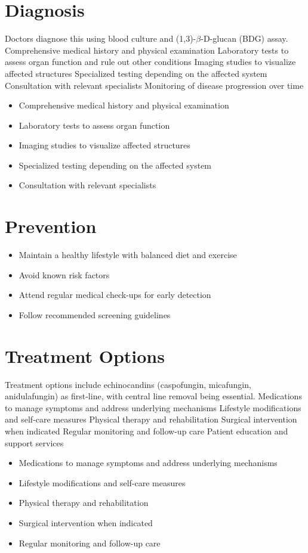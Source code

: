 \section{Diagnosis}
Doctors diagnose this using blood culture and (1,3)-$\beta$-D-glucan (BDG) assay. Comprehensive medical history and physical examination Laboratory tests to assess organ function and rule out other conditions Imaging studies to visualize affected structures Specialized testing depending on the affected system Consultation with relevant specialists Monitoring of disease progression over time

\begin{itemize}[noitemsep]
  \item Comprehensive medical history and physical examination
  \item Laboratory tests to assess organ function
  \item Imaging studies to visualize affected structures
  \item Specialized testing depending on the affected system
  \item Consultation with relevant specialists
\end{itemize}
\section{Prevention}
\begin{itemize}[noitemsep]
  \item Maintain a healthy lifestyle with balanced diet and exercise
  \item Avoid known risk factors
  \item Attend regular medical check-ups for early detection
  \item Follow recommended screening guidelines
\end{itemize}
\section{Treatment Options}
Treatment options include echinocandins (caspofungin, micafungin, anidulafungin) as first-line, with central line removal being essential. Medications to manage symptoms and address underlying mechanisms Lifestyle modifications and self-care measures Physical therapy and rehabilitation Surgical intervention when indicated Regular monitoring and follow-up care Patient education and support services

\begin{itemize}[noitemsep]
  \item Medications to manage symptoms and address underlying mechanisms
  \item Lifestyle modifications and self-care measures
  \item Physical therapy and rehabilitation
  \item Surgical intervention when indicated
  \item Regular monitoring and follow-up care
\end{itemize}

